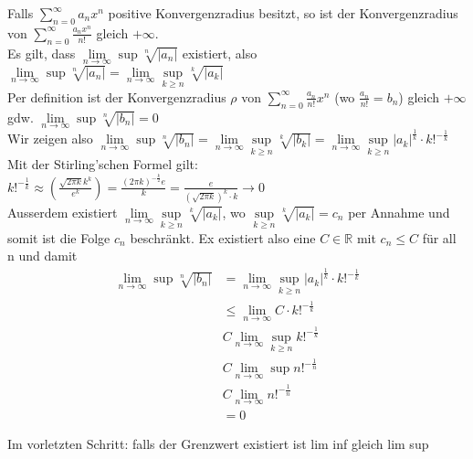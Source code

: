 \documentclass[a4paper,10pt]{article}
\def\limn{\lim\limits_{n\to \infty}}
\def\sumn{\sum\limits_{n=0}^{\infty}}
\def\R{\mathbb{R}}
\begin{document}
\begin{subbox}{}
  Falls $\sumn a_n x^n$ positive Konvergenzradius besitzt, so ist der Konvergenzradius von $\sumn \frac{a_n x^n}{n!}$ gleich $+\infty$.\\
  Es gilt, dass $\limn \sup \sqrt[n]{|a_n|}$ existiert, also $\limn \sup \sqrt[n]{|a_n|} = \limn \underset{k\geq n}{\sup} \sqrt[k]{|a_k|}$\\
  Per definition ist der Konvergenzradius $\rho$ von $\sumn \frac{a_n}{n!}x^n$ (wo $\frac{a_n}{n!}=b_n$) gleich $+\infty$ gdw. $\limn \sup \sqrt[n]{|b_n|}=0$\\
  Wir zeigen also $\limn\sup \sqrt[n]{|b_n|} = \limn \underset{k\geq n}{\sup} \sqrt[k]{|b_k|} = \limn \underset{k\geq n}{\sup}|a_k|^\frac{1}{k}\cdot k!^{-\frac{1}{k}}$\\
  Mit der Stirling'schen Formel gilt:\\
  $k!^{-\frac{1}{k}} \approx (\frac{\sqrt{2\pi k}k^k}{e^k}) = \frac{(2\pi k)^{-\frac{k}{2}}e}{k} = \frac{e}{(\sqrt{2\pi k})^k\cdot k} \rightarrow 0$\\
  Ausserdem existiert $\limn\underset{k\geq n}{\sup}\sqrt[k]{|a_k|}$, wo $\underset{k\geq n}{\sup}\sqrt[k]{|a_k|} = c_n$ per Annahme und somit ist die Folge $c_n$ beschränkt. Ex existiert also eine $C\in\R$ mit $c_n \leq C$ für all n und damit\\
  \begin{align*}
    \limn\sup\sqrt[n]{|b_n|} &= \limn \underset{k\geq n}{\sup}|a_k|^\frac{1}{k}\cdot k!^{-\frac{1}{k}}\\
    &\leq \limn C\cdot k!^{-\frac{1}{k}}\\
    &C \limn \underset{k \geq n}{\sup}k!^{-\frac{1}{k}}\\
    &C \limn \sup n!^{-\frac{1}{n}}\\
    &C \limn n!^{-\frac{1}{n}}\\
    &=0
  \end{align*}

  Im vorletzten Schritt: falls der Grenzwert existiert ist lim inf gleich lim sup 
\end{subbox}
\end{document}
